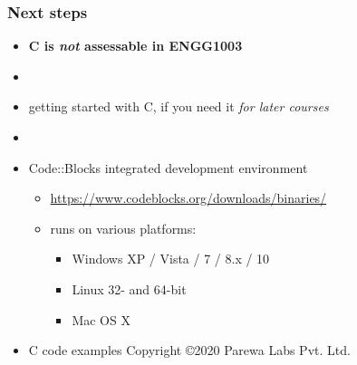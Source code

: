 \documentclass[english,14pt]{beamer}
\begin{document}

\begin{frame}[fragile]

\frametitle{Next steps}
\begin{itemize}
	\item[]\textbf{C is \emph{not} assessable in ENGG1003}
	\item[]
	\item getting started with C, if you need it \emph{for later courses}		
	\item[]
	\item Code::Blocks integrated development environment
	\begin{itemize}
		\item \href{https://www.codeblocks.org/downloads/binaries/}{https://www.codeblocks.org/downloads/binaries/}
		\item runs on various platforms:
		\begin{itemize}
			\item Windows XP / Vista / 7 / 8.x / 10
			\item Linux 32- and 64-bit
			\item Mac OS X
		\end{itemize}
	\end{itemize}
	\item[] {\tiny C code examples Copyright \copyright 2020 Parewa Labs Pvt. Ltd.}
\end{itemize}
	
\end{frame}
\end{document}
